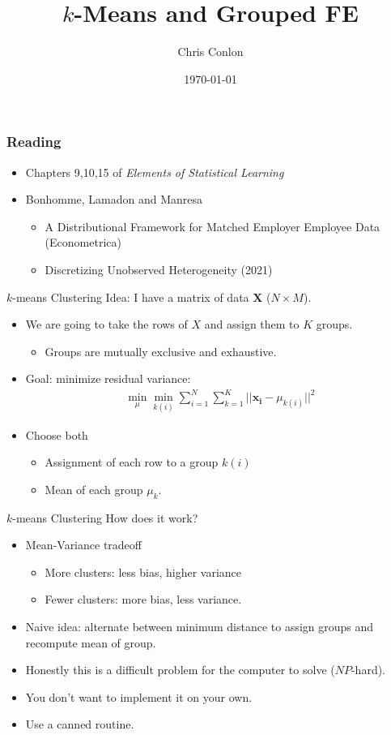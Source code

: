 \documentclass[xcolor=pdftex,dvipsnames,table,mathserif,aspectratio=169]{beamer}
\begin{document}
\title{$k$-Means and Grouped FE}
\author{Chris Conlon}
\date{\today}

\frame{\titlepage}


\begin{frame}
\frametitle{Reading}
\begin{itemize}
\item Chapters 9,10,15 of \textit{Elements of Statistical Learning}
\item Bonhomme, Lamadon and Manresa
\begin{itemize}
\item A Distributional Framework for Matched Employer Employee Data (Econometrica)
\item Discretizing Unobserved Heterogeneity (2021)
\end{itemize}
\end{itemize}
\end{frame}


\begin{frame}{$k$-means Clustering}
Idea: I have a matrix of data $\mathbf{X}$ ($N \times M$). 
\begin{itemize}
\item We are going to take the rows of $X$ and assign them to $K$ groups.
\begin{itemize}
\item Groups are mutually exclusive and exhaustive.
\end{itemize}
\item Goal: minimize residual variance:
\begin{align*}
\min_{\mu} \min_{k(i)} \sum_{i=1}^N \sum_{k=1}^K || \mathbf{x_i} - \mu_{k(i)} ||^2
\end{align*}
\item Choose both
\begin{itemize}
\item Assignment of each row to a group $k(i)$
\item Mean of each group $\mu_k$.
\end{itemize}
\end{itemize}
\end{frame}


\begin{frame}{$k$-means Clustering}
How does it work?
\begin{itemize}
\item Mean-Variance tradeoff
\begin{itemize}
\item More clusters: less bias, higher variance
\item Fewer clusters: more bias, less variance.
\end{itemize}
\item Naive idea: alternate between minimum distance to assign groups and recompute mean of group.
\item Honestly this is a difficult problem for the computer to solve ($NP$-hard).
\item You don't want to implement it on your own.
\item Use a canned routine.
\end{itemize}
\end{frame}
\end{document}
